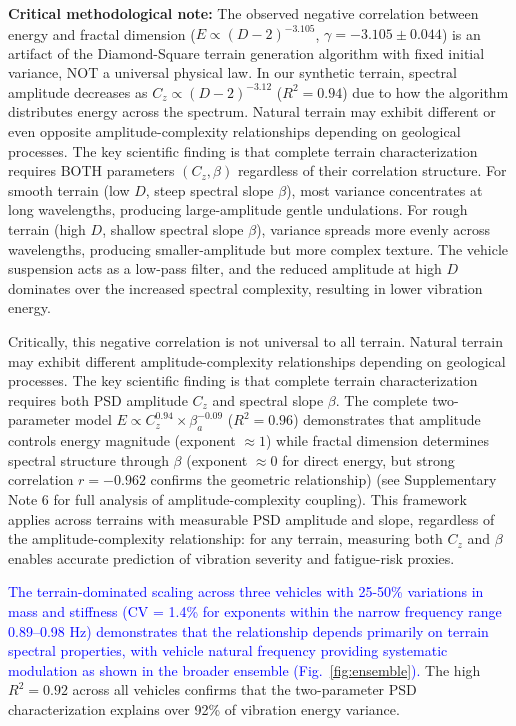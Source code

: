 \documentclass[11pt]{article}
\begin{document}
\textbf{Critical methodological note:} The observed negative correlation between energy and fractal dimension ($E \propto (D-2)^{-3.105}$, $\gamma = -3.105 \pm 0.044$) is an artifact of the Diamond-Square terrain generation algorithm with fixed initial variance, NOT a universal physical law. In our synthetic terrain, spectral amplitude decreases as $C_z \propto (D-2)^{-3.12}$ ($R^2 = 0.94$) due to how the algorithm distributes energy across the spectrum. Natural terrain may exhibit different or even opposite amplitude-complexity relationships depending on geological processes. The key scientific finding is that complete terrain characterization requires BOTH parameters $(C_z, \beta)$ regardless of their correlation structure. For smooth terrain (low $D$, steep spectral slope $\beta$), most variance concentrates at long wavelengths, producing large-amplitude gentle undulations. For rough terrain (high $D$, shallow spectral slope $\beta$), variance spreads more evenly across wavelengths, producing smaller-amplitude but more complex texture. The vehicle suspension acts as a low-pass filter, and the reduced amplitude at high $D$ dominates over the increased spectral complexity, resulting in lower vibration energy.

Critically, this negative correlation is not universal to all terrain. Natural terrain may exhibit different amplitude-complexity relationships depending on geological processes. The key scientific finding is that complete terrain characterization requires both PSD amplitude $C_z$ and spectral slope $\beta$. The complete two-parameter model $E \propto C_z^{0.94} \times \beta_a^{-0.09}$ ($R^2 = 0.96$) demonstrates that amplitude controls energy magnitude (exponent $\approx 1$) while fractal dimension determines spectral structure through $\beta$ (exponent $\approx 0$ for direct energy, but strong correlation $r=-0.962$ confirms the geometric relationship) (see Supplementary Note 6 for full analysis of amplitude-complexity coupling). This framework applies across terrains with measurable PSD amplitude and slope, regardless of the amplitude-complexity relationship: for any terrain, measuring both $C_z$ and $\beta$ enables accurate prediction of vibration severity and fatigue-risk proxies.

\textcolor{blue}{The terrain-dominated scaling across three vehicles with 25-50\% variations in mass and stiffness (CV = 1.4\% for exponents within the narrow frequency range 0.89--0.98 Hz) demonstrates that the relationship depends primarily on terrain spectral properties, with vehicle natural frequency providing systematic modulation as shown in the broader ensemble (Fig.~\ref{fig:ensemble}).} The high $R^2 = 0.92$ across all vehicles confirms that the two-parameter PSD characterization explains over 92\% of vibration energy variance.
\end{document}
